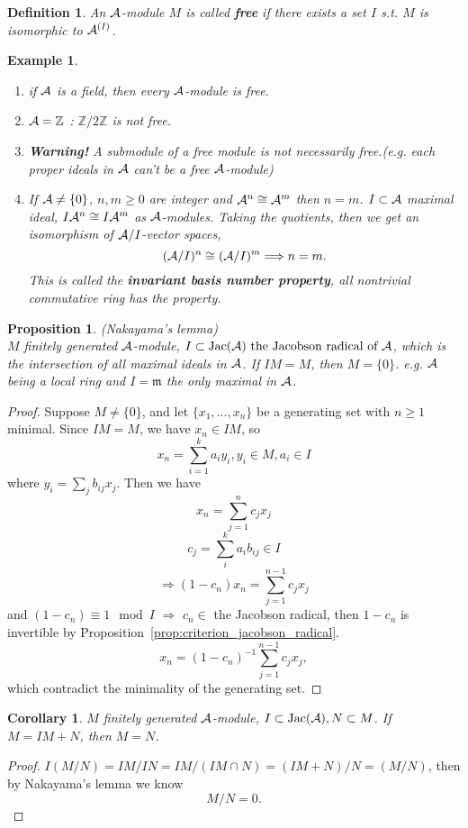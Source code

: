 \documentclass[11pt]{article}
\newtheorem{prop}[thm]{Proposition}
\newtheorem{cor}[thm]{Corollary}
\newtheorem{dfn}[thm]{Definition}
\newtheorem{ex}[thm]{Example}
\newcommand{\intg}{\mathbb Z}
\newcommand{\scm}{{\mathfrak m}}
\newcommand{\cala}{{\cal A}}
\newcommand{\Lrta}{\Longrightarrow}
\begin{document}
\begin{dfn}
An $\cala$-module $M$ is called \textbf{free} if there exists a set $I$ s.t. $M$ is isomorphic to $\cala^{(I)}$.
\end{dfn}
\begin{ex}\ 
\begin{enumerate}
\item if $\cala$ is a field, then every $\cala$-module is free.
\item $\cala=\intg$ : $\intg/2\intg$ is not free.
\item \textbf{Warning!} A submodule of a free module is not necessarily free.(e.g. each proper ideals in $\cala$ can't be a free $\cala$-module)
\item If $\cala\neq \{0\}$, $n,m\geq 0$ are integer and $\cala^n\cong \cala^m$ then $n=m$.
$I\subset \cala$ maximal ideal, $I\cala^n\cong I\cala^m$ as $\cala$-modules. Taking the quotients, then we get an isomorphism of $\cala/I$-vector spaces,
$$
(\cala/I)^n\cong(\cala/I)^m\Lrta n=m.
$$
This is called the \textbf{invariant basis number property}, all nontrivial commutative ring has the property. 
\end{enumerate}
\end{ex}

\begin{prop}\label{lem:Nakayama}
(Nakayama's lemma)\\
$M$ finitely generated $\cala$-module, $I\subset \text{Jac}(\cala) \text{  the Jacobson radical of $\cala$}$, which is the intersection of all maximal ideals in $\cala$.
If $IM=M$, then $M=\{0\}$. e.g. 
$\cala$ being a local ring and $I=\scm$ the only maximal in $\cala$.
\end{prop}

\begin{proof}
Suppose $M\neq \{0\}$, and let $\{x_1,...,x_n\}$ be a generating set with $n\geq1$ minimal.
Since $IM=M$, we have $x_n\in IM$, so
$$
x_n=\sum_{i=1}^k
a_i y_i, y_i\in M, a_i\in I
$$
where $y_i=\sum_j b_{ij }x_j$.
Then we have 
$$
x_n=\sum_{j=1}^n c_j x_j
$$
$$
c_j=\sum_i^k a_i b_{ij}\in I
$$
$$
\Lrta (1-c_n)x_n=\sum_{j=1}^{n-1}c_j x_j
$$ 
and
$(1-c_n)\equiv 1\mod I$ $\Lrta$ $c_n\in$ the Jacobson radical, then  $1-c_n$ is invertible by Proposition~\ref{prop:criterion_jacobson_radical}.
$$
x_n=(1-c_n)^{-1}\sum_{j=1}^{n-1}c_j x_j,
$$ 
which contradict the minimality of the generating set.
\end{proof}

\begin{cor}\label{cor:Nakayama1}
$M$ finitely generated $\cala$-module, $I \subset \text{Jac}(\cala), N\subset M$. If $M=IM +N$, then $M=N$.
\end{cor}
\begin{proof}
$I(M/N)=IM/IN=IM/(IM\cap N)=(IM+N)/N=(M/N)$, then by Nakayama's lemma we know 
$$
M/N={0}.
$$
\end{proof}
\end{document}

